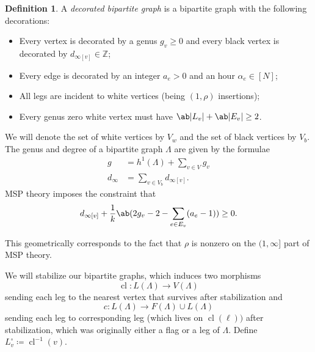 \documentclass[10pt]{amsart}
\theoremstyle{definition}
\newtheorem{defn}[thm]{Definition}
\theoremstyle{remark}
\theoremstyle{plain}
\theoremstyle{definition}
\theoremstyle{remark}
\newcommand{\Z}{\mathbb{Z}}
\newcommand{\1}{\mathbf{1}}
\newcommand{\2}{\mathbf{2}}
\newcommand{\3}{\mathbf{3}}
\DeclareMathOperator{\cl}{cl}
\numberwithin{equation}{section}
\begin{document}
\begin{defn}
    A \textit{decorated bipartite graph} is a bipartite graph with the following decorations:
    \begin{itemize}
        \item Every vertex is decorated by a genus $g_v \geq 0$ and every black vertex is decorated by $d_{\infty[v]} \in \Z$;
        \item Every edge is decorated by an integer $a_e > 0$ and an hour $\alpha_e \in [N]$;
        \item All legs are incident to white vertices (being $(1,\rho)$ insertions);
        \item Every genus zero white vertex must have $\ab|L_v| + \ab|E_v| \geq 2$.
    \end{itemize}
    We will denote the set of white vertices by $V_w$ and the set of black vertices by $V_b$. The genus and degree of a bipartite graph $\Lambda$ are given by the formulae
    \begin{align*}
        g &= h^1(\Lambda) + \sum_{v \in V} g_v \\
        d_{\infty} &= \sum_{v \in V_b} d_{\infty[v]} .
    \end{align*}
    MSP theory imposes the constraint that
    \begin{equation}\label{eqn:rhoinfty}
    d_{\infty[v]} + \frac{1}{k} \ab(2g_v-2 - \sum_{e \in E_v} (a_e-1)) \geq 0. 
    \end{equation}
    
    This geometrically corresponds to the fact that $\rho$ is nonzero on the $(1,\infty]$ part of MSP theory.
\end{defn}

We will stabilize our bipartite graphs, which induces two morphisms
\[ \cl \colon L(\Lambda) \to V(\Lambda) \]
sending each leg to the nearest vertex that survives after stabilization and
\[ c \colon L(\Lambda) \to F(\Lambda) \cup L(\Lambda) \]
sending each leg to corresponding leg (which lives on $\cl(\ell))$ after stabilization, which was originally either a flag or a leg of $\Lambda$. Define $L_v^{\circ} \coloneqq \cl^{-1}(v)$.
\end{document}
